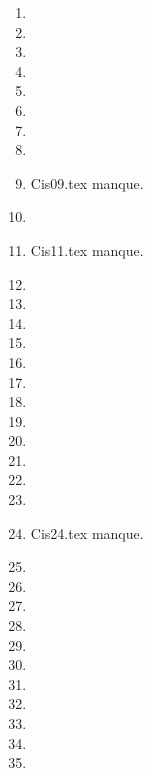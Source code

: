 \begin{enumerate}
  \item  
  \item  
  \item  
  \item  
  \item  
  \item  
  \item  
  \item  
  \item Cis09.tex manque. 
  \item  
  \item Cis11.tex manque. 
  \item  
  \item  
  \item  
  \item  
  \item  
  \item  
  \item  
  \item  
  \item  
  \item  
  \item  
  \item  
  \item Cis24.tex manque. 
  \item  
  \item  
  \item  
  \item  
  \item  
  \item  
  \item  
  \item  
  \item  
  \item  
  \item  
\end{enumerate} 
